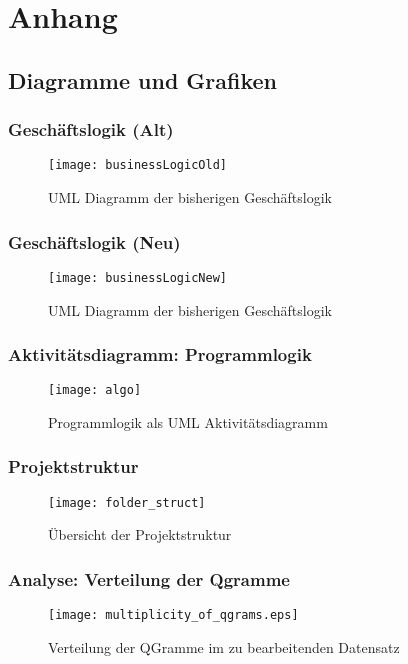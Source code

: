 \section{Anhang}
\subsection{Diagramme und Grafiken}

\subsubsection{Geschäftslogik (Alt)}
\begin{figure}
	\caption{UML Diagramm der bisherigen Geschäftslogik}
	\label{fig:businessLogicAlt}
    \texttt{[image: businessLogicOld]}
\end{figure}

\subsubsection{Geschäftslogik (Neu)}
\begin{figure}
	\caption{UML Diagramm der bisherigen Geschäftslogik}
	\label{fig:businessLogicAlt}
    \texttt{[image: businessLogicNew]}
\end{figure}


\subsubsection{Aktivitätsdiagramm: Programmlogik}
\begin{figure}[!htp]
	\caption{Programmlogik als UML Aktivitätsdiagramm}
	\label{fig:programmlogik}
	\texttt{[image: algo]}
	\centering
\end{figure}

\subsubsection{Projektstruktur}
\begin{figure}[!htp]
	\caption{Übersicht der Projektstruktur}
	\label{fig:folderstruct}
	\texttt{[image: folder\_struct]}
\end{figure}

\subsubsection{Analyse: Verteilung der Qgramme}
\begin{figure}[!htp]
    \caption{Verteilung der QGramme im zu bearbeitenden Datensatz}
    \label{fig:qgram_verteilung}
    \texttt{[image: multiplicity\_of\_qgrams.eps]}
    \centering
\end{figure}

